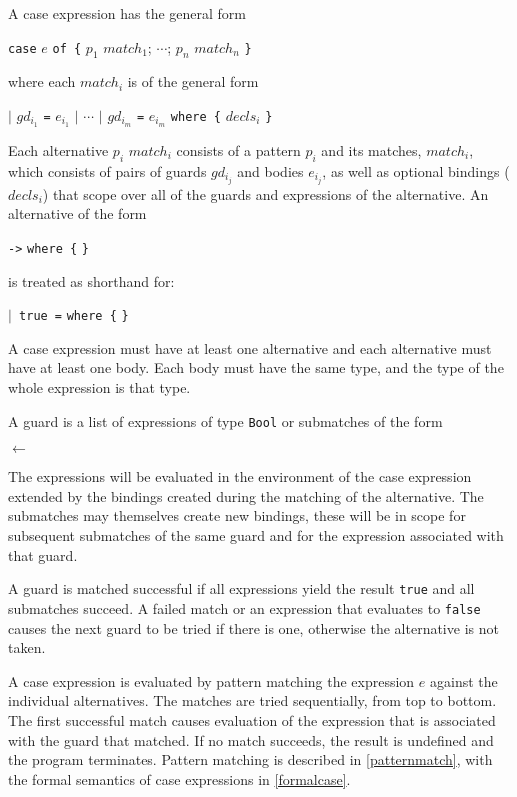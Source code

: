 A case expression has the general form
\begin{center}
\texttt{case} $e$ \texttt{of \{} $p_1$ $match_1$; $\cdots$; $p_n$ $match_n$ \texttt{\}}
\end{center}
where each $match_i$ is of the general form
\begin{center}
\texttt{$|$} $gd_{i_1}$ \texttt{=} $e_{i_1}$
\texttt{$|$} $\cdots$
\texttt{$|$} $gd_{i_m}$ \texttt{=} $e_{i_m}$
\texttt{where \{} $decls_i$ \texttt{\}}
\end{center}
Each alternative $p_i$ $match_i$ consists of a pattern $p_i$ and its matches, $match_i$, which consists of pairs of guards $gd_{i_j}$ and bodies $e_{i_j}$, as well as optional bindings ($decls_i$) that scope over all of the guards and expressions of the alternative.
An alternative of the form
\begin{center}
 \texttt{->}  \texttt{where \{}  \texttt{\}}
\end{center}
is treated as shorthand for:
\begin{center}
 \texttt{$|$ true =}  \texttt{where \{}  \texttt{\}}
\end{center}


A case expression must have at least one alternative and each alternative must have at least one body.
Each body must have the same type, and the type of the whole expression is that type.

A guard is a list of expressions of type \texttt{Bool} or submatches of the form
\begin{center}
 \texttt{$\leftarrow$} 
\end{center}
The expressions will be evaluated in the environment of the case expression extended by the bindings created during the matching of the alternative.
The submatches may themselves create new bindings, these will be in scope for subsequent submatches of the same guard and for the expression associated with that guard.

A guard is matched successful if all expressions yield the result \texttt{true} and all submatches succeed.
A failed match or an expression that evaluates to \texttt{false} causes the next guard to be tried if there is one, otherwise the alternative is not taken.

A case expression is evaluated by pattern matching the expression $e$ against the individual alternatives.
The matches are tried sequentially, from top to bottom.
The first successful match causes evaluation of the expression that is associated with the guard that matched.
If no match succeeds, the result is undefined and the program terminates.
Pattern matching is described in \autoref{patternmatch}, with the formal semantics of case expressions
in \autoref{formalcase}.

